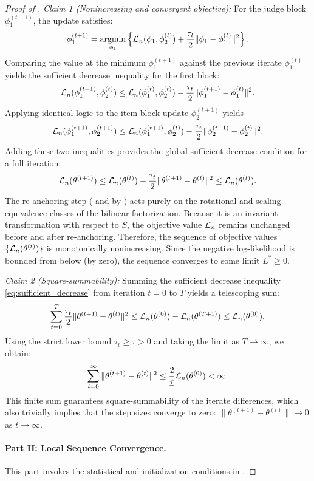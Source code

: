 \documentclass{article}
\begin{document}
\begin{bibunit}[unsrtnat]
\begin{proof}[Proof of ]
\textit{Claim 1 (Nonincreasing and convergent objective):}
For the judge block $\phi_1^{(t+1)}$, the update satisfies:
\[
\phi_1^{(t+1)} = \mathop{\mathrm{argmin}}_{\phi_1} \left\{ \mathcal{L}_n(\phi_1, \phi_2^{(t)}) + \frac{\tau_t}{2}\|\phi_1 - \phi_1^{(t)}\|^2 \right\}.
\]
Comparing the value at the minimum $\phi_1^{(t+1)}$ against the previous iterate $\phi_1^{(t)}$ yields the sufficient decrease inequality for the first block:
\[
\mathcal{L}_n(\phi_1^{(t+1)}, \phi_2^{(t)}) \le \mathcal{L}_n(\phi_1^{(t)}, \phi_2^{(t)}) - \frac{\tau_t}{2}\|\phi_1^{(t+1)} - \phi_1^{(t)}\|^2.
\]
Applying identical logic to the item block update $\phi_2^{(t+1)}$ yields
\[
\mathcal{L}_n(\phi_1^{(t+1)}, \phi_2^{(t+1)}) \le \mathcal{L}_n(\phi_1^{(t+1)}, \phi_2^{(t)}) - \frac{\tau_t}{2}\|\phi_2^{(t+1)} - \phi_2^{(t)}\|^2.
\]
Adding these two inequalities provides the global sufficient decrease condition for a full iteration:
\begin{equation}\label{eq:sufficient_decrease}
\mathcal{L}_n(\theta^{(t+1)}) \le \mathcal{L}_n(\theta^{(t)}) - \frac{\tau_t}{2}\|\theta^{(t+1)} - \theta^{(t)}\|^2\leq \mathcal{L}_n(\theta^{(t)}).
\end{equation}
The re-anchoring step ( and by ) acts purely on the rotational and scaling equivalence classes of the bilinear factorization. Because it is an invariant transformation with respect to $S$, the objective value $\mathcal{L}_n$ remains unchanged before and after re-anchoring. Therefore, the sequence of objective values $\{\mathcal{L}_n(\theta^{(t)})\}$ is monotonically nonincreasing. Since the negative log-likelihood is bounded from below (by zero), the sequence converges to some limit $L^\ast \ge 0$.

\textit{Claim 2 (Square-summability):}
Summing the sufficient decrease inequality \eqref{eq:sufficient_decrease} from iteration $t=0$ to $T$ yields a telescoping sum:
\[
\sum_{t=0}^T \frac{\tau_t}{2}\|\theta^{(t+1)} - \theta^{(t)}\|^2 \le \mathcal{L}_n(\theta^{(0)}) - \mathcal{L}_n(\theta^{(T+1)}) \le \mathcal{L}_n(\theta^{(0)}).
\]
Using the strict lower bound $\tau_t \ge \underline{\tau} > 0$ and taking the limit as $T \to \infty$, we obtain:
\[
\sum_{t=0}^\infty \|\theta^{(t+1)} - \theta^{(t)}\|^2 \le \frac{2}{\underline{\tau}}\mathcal{L}_n(\theta^{(0)})< \infty.
\]
This finite sum guarantees square-summability of the iterate differences, which also trivially implies that the step sizes converge to zero: $\|\theta^{(t+1)} - \theta^{(t)}\| \to 0$ as $t \to \infty$.
\paragraph{Part II: Local Sequence Convergence.}
This part invokes the statistical and initialization conditions in .


\end{proof}
\end{bibunit}
\end{document}
